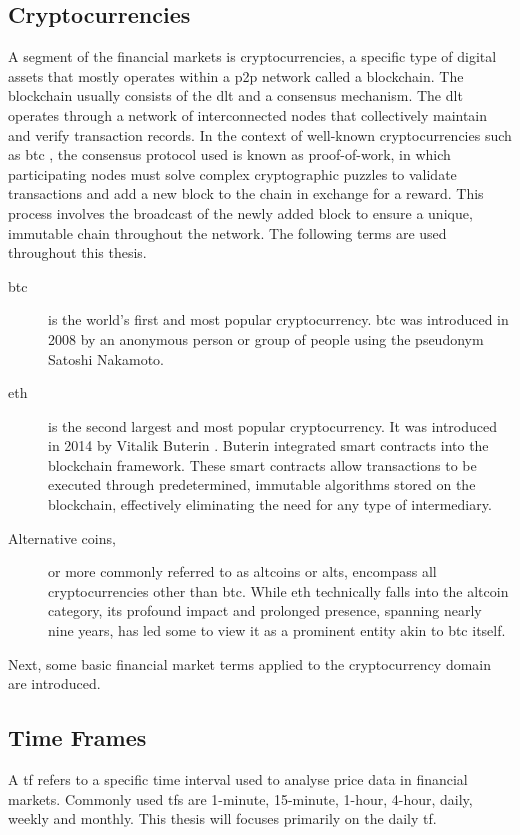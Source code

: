 \subsection{Cryptocurrencies}
\label{sub:crypto}
A segment of the financial markets is cryptocurrencies, a specific type of digital assets that mostly operates within a \gls{p2p} network called a blockchain. The blockchain usually consists of the \gls{dlt} and a consensus mechanism. The \gls{dlt} operates through a network of interconnected nodes that collectively maintain and verify transaction records. In the context of well-known cryptocurrencies such as \gls{btc} \citep{bitcoin_2008}, the consensus protocol used is known as proof-of-work, in which participating nodes must solve complex cryptographic puzzles to validate transactions and add a new block to the chain in exchange for a reward. This process involves the broadcast of the newly added block to ensure a unique, immutable chain throughout the network. The following terms are used throughout this thesis.

\begin{description}
    \item[\gls{btc}] is the world's first and most popular cryptocurrency. \gls{btc} was introduced in 2008 by an anonymous person or group of people using the pseudonym Satoshi Nakamoto.
    \item[\gls{eth}] is the second largest and most popular cryptocurrency. It was introduced in 2014 by Vitalik Buterin \citep{eth_2014}. Buterin integrated smart contracts into the blockchain framework. These smart contracts allow transactions to be executed through predetermined, immutable algorithms stored on the blockchain, effectively eliminating the need for any type of intermediary.
    \item[Alternative coins,] or more commonly referred to as altcoins or alts, encompass all cryptocurrencies other than \gls{btc}. While \gls{eth} technically falls into the altcoin category, its profound impact and prolonged presence, spanning nearly nine years, has led some to view it as a prominent entity akin to \gls{btc} itself.
\end{description}

\noindent
Next, some basic financial market terms applied to the cryptocurrency domain are introduced.

\subsection{Time Frames}
\label{sub:TF}
A \gls{tf} refers to a specific time interval used to analyse price data in financial markets. Commonly used \glspl{tf} are 1-minute, 15-minute, 1-hour, 4-hour, daily, weekly and monthly. This thesis will focuses primarily on the daily \gls{tf}.

